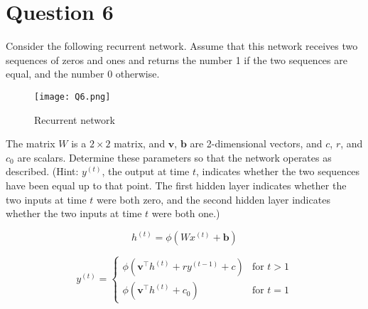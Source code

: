 \section{Question 6}
Consider the following recurrent network. Assume that this network receives two sequences of zeros and ones and returns the number 1 if the two sequences are equal, and the number 0 otherwise.
\begin{figure}[H]
	\centering
	\texttt{[image: Q6.png]}
	\caption{Recurrent network}
\end{figure}
The matrix \(W\) is a \(2 \times 2\) matrix, and \(\mathbf{v}\), \(\mathbf{b}\) are 2-dimensional vectors, and \(c\), \(r\), and \(c_0\) are scalars. Determine these parameters so that the network operates as described. (Hint: \(y^{(t)}\), the output at time \(t\), indicates whether the two sequences have been equal up to that point. The first hidden layer indicates whether the two inputs at time \(t\) were both zero, and the second hidden layer indicates whether the two inputs at time \(t\) were both one.)

\[
h^{(t)} = \phi\left(W x^{(t)} + \mathbf{b}\right)
\]

\[
y^{(t)} =
\begin{cases} 
    \phi\left(\mathbf{v}^\top h^{(t)} + r y^{(t-1)} + c\right) & \text{for } t > 1 \\
    \phi\left(\mathbf{v}^\top h^{(t)} + c_0\right) & \text{for } t = 1
\end{cases}
\]

